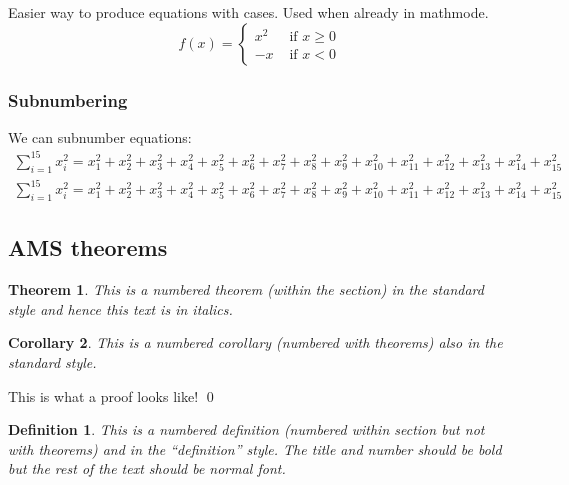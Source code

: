 \documentclass[12pt,a4paper]{article}
\theoremstyle{clearprint}
\renewenvironment{proof}[1][\proofname]
{\noindent{\bf {#1}.}\hspace*{1em}}%
{\qed\par}%
\newtheorem{theorem}{Theorem}[section]
\newtheorem{corollary}[theorem]{Corollary}
\newtheorem{definition}{Definition}[section]
\begin{document}
Easier way to produce equations with cases. Used when already in mathmode. 
\begin{equation*}
f(x) = \begin{cases} x^2 & \text{ if } x\geq0\\
-x & \text{ if } x<0 \end{cases}
\end{equation*}

\subsubsection[Subnumbering]{Subnumbering}

\noindent
We can subnumber equations:
\begin{subequations}
\begin{gather}
\sum_{i=1}^{15} x_i^2 = x_1^2 + x_2^2 + x_3^2 + x_4^2 + x_5^2 + x_6^2 + x_7^2 + x_8^2 + x_9^2 + x_{10}^2 + x_{11}^2 + x_{12}^2 + x_{13}^2 + x_{14}^2 + x_{15}^2 \\
\sum_{i=1}^{15} x_i^2 = x_1^2 + x_2^2 + x_3^2 + x_4^2 + x_5^2 + x_6^2 + x_7^2 + x_8^2 + x_9^2 + x_{10}^2 + x_{11}^2 + x_{12}^2 + x_{13}^2 + x_{14}^2 + x_{15}^2 
\end{gather}
\end{subequations}

\subsection[AMS theorems]{AMS theorems}
\setcounter{equation}{0}

\begin{theorem}
This is a numbered theorem (within the section) in the standard style and hence this text is in italics. 
\end{theorem}

\begin{corollary}
This is a numbered corollary (numbered with theorems) also in the standard style.
\end{corollary}

\begin{proof}
This is what a proof looks like! 
\end{proof}

\begin{definition}
This is a numbered definition (numbered within section but not with theorems) and in the ``definition'' style. The title and number should be bold but the rest of the text should be normal font.
\end{definition}
\end{document}
